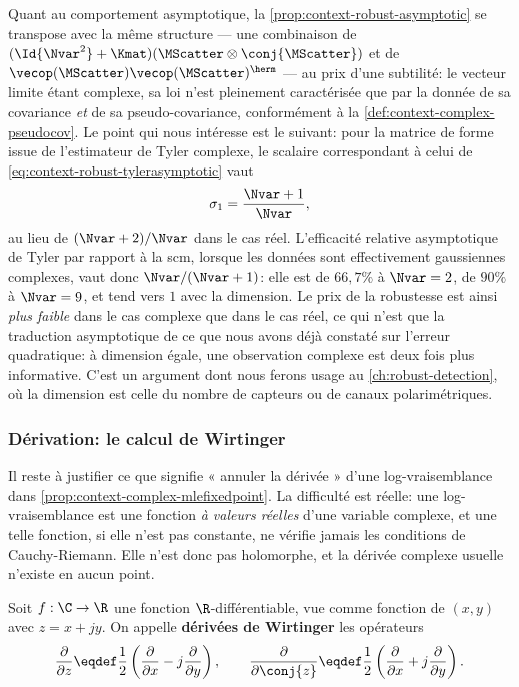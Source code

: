Quant au comportement asymptotique, la \cref{prop:context-robust-asymptotic} se transpose avec la même structure — une combinaison de $(\Id{\Nvar^2}+\Kmat)(\MScatter\otimes\conj{\MScatter})$ et de $\vecop(\MScatter)\vecop(\MScatter)^\herm$ — au prix d'une subtilité: le vecteur limite étant complexe, sa loi n'est pleinement caractérisée que par la donnée de sa covariance \emph{et} de sa pseudo-covariance, conformément à la \cref{def:context-complex-pseudocov}. Le point qui nous intéresse est le suivant: pour la matrice de forme issue de l'estimateur de Tyler complexe, le scalaire correspondant à celui de \cref{eq:context-robust-tylerasymptotic} vaut
\begin{equation}
  \sigma_1 = \frac{\Nvar+1}{\Nvar},
  \label{eq:context-complex-tylerasymptotic}
\end{equation}
au lieu de $(\Nvar+2)/\Nvar$ dans le cas réel. L'efficacité relative asymptotique de Tyler par rapport à la scm, lorsque les données sont effectivement gaussiennes complexes, vaut donc $\Nvar/(\Nvar+1)$: elle est de $66,7\%$ à $\Nvar=2$, de $90\%$ à $\Nvar=9$, et tend vers $1$ avec la dimension. Le prix de la robustesse est ainsi \emph{plus faible} dans le cas complexe que dans le cas réel, ce qui n'est que la traduction asymptotique de ce que nous avons déjà constaté sur l'erreur quadratique: à dimension égale, une observation complexe est deux fois plus informative. C'est un argument dont nous ferons usage au \cref{ch:robust-detection}, où la dimension est celle du nombre de capteurs ou de canaux polarimétriques.

\subsubsection{Dérivation: le calcul de Wirtinger}

Il reste à justifier ce que signifie « annuler la dérivée » d'une log-vraisemblance dans \cref{prop:context-complex-mlefixedpoint}. La difficulté est réelle: une log-vraisemblance est une fonction \emph{à valeurs réelles} d'une variable complexe, et une telle fonction, si elle n'est pas constante, ne vérifie jamais les conditions de Cauchy-Riemann. Elle n'est donc pas holomorphe, et la dérivée complexe usuelle n'existe en aucun point.

\begin{definition}
\label{def:context-complex-wirtinger}
  Soit $f:\C\to\R$ une fonction $\R$-différentiable, vue comme fonction de $(x,y)$ avec $z=x+jy$. On appelle \textbf{dérivées de Wirtinger}  les opérateurs
  \begin{equation}
    \frac{\partial}{\partial z}
    \eqdef
    \frac{1}{2}\left(\frac{\partial}{\partial x} - j\frac{\partial}{\partial y}\right),
    \qquad
    \frac{\partial}{\partial \conj{z}}
    \eqdef
    \frac{1}{2}\left(\frac{\partial}{\partial x} + j\frac{\partial}{\partial y}\right).
    \label{eq:context-complex-wirtinger}
  \end{equation}
\end{definition}

